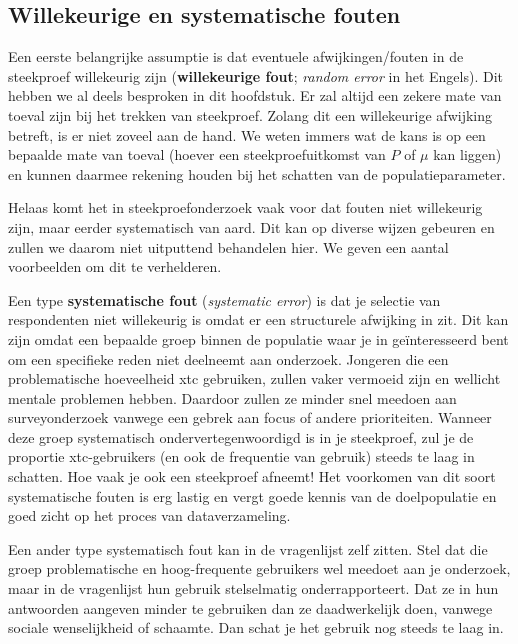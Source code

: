\documentclass[
  letterpaper,
  DIV=11,
  numbers=noendperiod]{scrreprt}
\begin{document}
\subsection{Willekeurige en systematische
fouten}\label{willekeurige-en-systematische-fouten}

Een eerste belangrijke assumptie is dat eventuele afwijkingen/fouten in
de steekproef willekeurig zijn (\textbf{willekeurige fout}; \emph{random
error} in het Engels). Dit hebben we al deels besproken in dit
hoofdstuk. Er zal altijd een zekere mate van toeval zijn bij het trekken
van steekproef. Zolang dit een willekeurige afwijking betreft, is er
niet zoveel aan de hand. We weten immers wat de kans is op een bepaalde
mate van toeval (hoever een steekproefuitkomst van \(P\) of \(\mu\) kan
liggen) en kunnen daarmee rekening houden bij het schatten van de
populatieparameter.

Helaas komt het in steekproefonderzoek vaak voor dat fouten niet
willekeurig zijn, maar eerder systematisch van aard. Dit kan op diverse
wijzen gebeuren en zullen we daarom niet uitputtend behandelen hier. We
geven een aantal voorbeelden om dit te verhelderen.

Een type \textbf{systematische fout} (\emph{systematic error}) is dat je
selectie van respondenten niet willekeurig is omdat er een structurele
afwijking in zit. Dit kan zijn omdat een bepaalde groep binnen de
populatie waar je in geïnteresseerd bent om een specifieke reden niet
deelneemt aan onderzoek. Jongeren die een problematische hoeveelheid xtc
gebruiken, zullen vaker vermoeid zijn en wellicht mentale problemen
hebben. Daardoor zullen ze minder snel meedoen aan surveyonderzoek
vanwege een gebrek aan focus of andere prioriteiten. Wanneer deze groep
systematisch ondervertegenwoordigd is in je steekproef, zul je de
proportie xtc-gebruikers (en ook de frequentie van gebruik) steeds te
laag in schatten. Hoe vaak je ook een steekproef afneemt! Het voorkomen
van dit soort systematische fouten is erg lastig en vergt goede kennis
van de doelpopulatie en goed zicht op het proces van dataverzameling.

Een ander type systematisch fout kan in de vragenlijst zelf zitten. Stel
dat die groep problematische en hoog-frequente gebruikers wel meedoet
aan je onderzoek, maar in de vragenlijst hun gebruik stelselmatig
onderrapporteert. Dat ze in hun antwoorden aangeven minder te gebruiken
dan ze daadwerkelijk doen, vanwege sociale wenselijkheid of schaamte.
Dan schat je het gebruik nog steeds te laag in.
\end{document}
